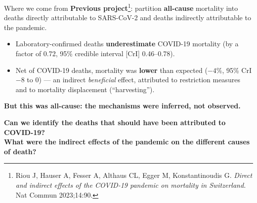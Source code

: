 \documentclass[aspectratio=169,10pt]{beamer}
\newcommand{\compresslist}{%
  \setlength{\itemsep}{3pt}%
  \setlength{\parskip}{0pt}%
  \setlength{\parsep}{0pt}%
}
\newcommand{\punch}[1]{{\color{headerfontcol}\bfseries #1}}
\begin{document}
\begin{frame}{Where we come from}
  \textbf{Previous project}\footnote[frame]{\tiny Riou J, Hauser A, Fesser A,
    Althaus CL, Egger M, Konstantinoudis G. \emph{Direct and indirect effects of
    the COVID-19 pandemic on mortality in Switzerland.} Nat Commun 2023;14:90.}:
  partition \textbf{all-cause} mortality into deaths directly attributable to
  SARS-CoV-2 and deaths indirectly attributable to the pandemic.
  \begin{itemize}\compresslist
    \item Laboratory-confirmed deaths \textbf{underestimate} COVID-19 mortality
          (by a factor of 0.72, 95\% credible interval [CrI] 0.46--0.78).
    \item Net of COVID-19 deaths, mortality was \textbf{lower} than expected
          ($-4\%$, 95\% CrI $-8$ to $0$) --- an indirect \emph{beneficial} effect,
          attributed to restriction measures and to mortality displacement
          (``harvesting'').
  \end{itemize}
  \vfill
  \textbf{But this was all-cause: the mechanisms were inferred, not observed.}
  \vfill
  \begin{center}
    \punch{Can we identify the deaths that should have been attributed to COVID-19?}\\[0.2em]
    \punch{What were the indirect effects of the pandemic on the different causes of death?}
  \end{center}
  \vfill
\end{frame}
\end{document}
